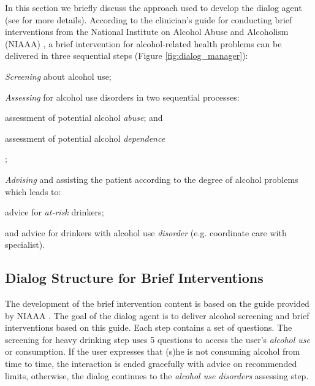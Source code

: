 \documentclass[letterpaper]{article}
\begin{document}
In this section we briefly discuss the approach used to develop the dialog 
agent (see \cite{YASCLL14} for more details). According to the 
clinician's guide for conducting brief interventions from the National Institute on Alcohol Abuse 
and Alcoholism (NIAAA) \cite{national2007helping}, a brief intervention for alcohol-related health 
problems can be delivered in three sequential steps (Figure 
\ref{fig:dialog_manager}): \begin{inparaenum}[1)] \item {\em Screening} about alcohol use; \item 
{\em Assessing} for alcohol use disorders in two sequential processes: \begin{inparaenum}[a)] \item 
assessment of potential alcohol {\em abuse}; and \item assessment  of potential alcohol {\em 
dependence}\end{inparaenum}; \item {\em Advising} and assisting the patient according to 
the degree of alcohol problems which leads to: \begin{inparaenum} \item advice for {\em at-risk} 
drinkers; \item and advice for drinkers with alcohol use {\em disorder} (e.g. coordinate care with specialist). \end{inparaenum} 
\end{inparaenum}

\subsection*{Dialog Structure for Brief Interventions}

The development of the brief intervention content is based on the guide provided by 
NIAAA \cite{national2006niaaa}. The goal of the dialog agent is to deliver alcohol screening and 
brief interventions based on this guide. Each step contains a set of questions. The screening for heavy drinking step 
uses 5 questions to access the user's {\em alcohol use} or consumption.  If the user 
expresses that (s)he is not consuming alcohol from time to time, the interaction is  ended gracefully
 with advice on recommended limits, otherwise, the dialog continues to the {\em alcohol use disorders} assessing step.  
\end{document}
